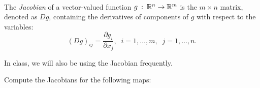 \\
The \textit{Jacobian} of a vector-valued function $g \::\: \mathbb{R}^n \rightarrow \mathbb{R}^{m}$ is the $m \times n$ matrix, denoted as $D g$, containing the derivatives of components of $g$ with respect to the variables:
\[
(Dg)_{ij} = \frac{\partial g_i}{\partial x_j}, \;\; i = 1, \ldots, m, \;\; j = 1, \ldots, n.
\]

In class, we will also be using the Jacobian frequently.

Compute the Jacobians for the following maps:

\begin{enumerate}


\sol{}



\sol{}



\sol{}



\sol{}
\end{enumerate}